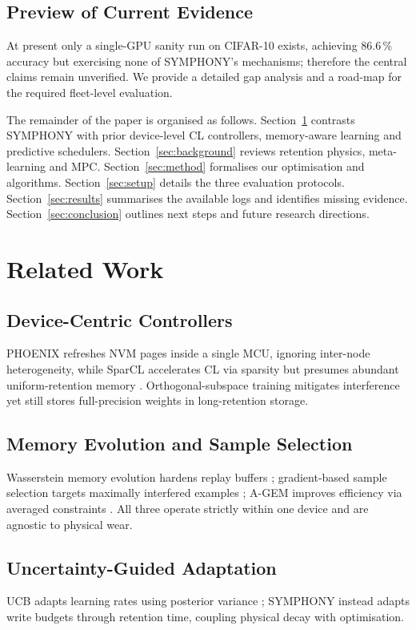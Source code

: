 \documentclass{article}
\begin{document}
\subsection{Preview of Current Evidence}
At present only a single-GPU sanity run on CIFAR-10 exists, achieving 86.6\,\% accuracy but exercising none of SYMPHONY’s mechanisms; therefore the central claims remain unverified. We provide a detailed gap analysis and a road-map for the required fleet-level evaluation.

The remainder of the paper is organised as follows. Section~\ref{sec:related} contrasts SYMPHONY with prior device-level CL controllers, memory-aware learning and predictive schedulers. Section~\ref{sec:background} reviews retention physics, meta-learning and MPC. Section~\ref{sec:method} formalises our optimisation and algorithms. Section~\ref{sec:setup} details the three evaluation protocols. Section~\ref{sec:results} summarises the available logs and identifies missing evidence. Section~\ref{sec:conclusion} outlines next steps and future research directions.

\section{Related Work}\label{sec:related}
\subsection{Device-Centric Controllers}
PHOENIX refreshes NVM pages inside a single MCU, ignoring inter-node heterogeneity, while SparCL accelerates CL via sparsity but presumes abundant uniform-retention memory \cite{wang-2022-sparcl}. Orthogonal-subspace training mitigates interference \cite{chaudhry-2020-continual} yet still stores full-precision weights in long-retention storage.

\subsection{Memory Evolution and Sample Selection}
Wasserstein memory evolution hardens replay buffers \cite{wang-2022-improving}; gradient-based sample selection targets maximally interfered examples \cite{aljundi-2019-gradient}; A-GEM improves efficiency via averaged constraints \cite{chaudhry-2018-lifelong}. All three operate strictly within one device and are agnostic to physical wear.

\subsection{Uncertainty-Guided Adaptation}
UCB adapts learning rates using posterior variance \cite{ebrahimi-2019-uncertainty}; SYMPHONY instead adapts write budgets through retention time, coupling physical decay with optimisation.
\end{document}
